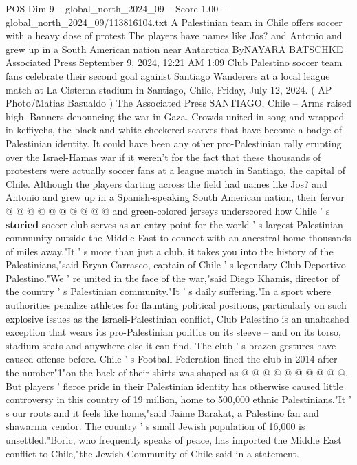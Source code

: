 \begin{textsample}{POS Dim 9 – global\_north\_2024\_09 – Score 1.00 – global\_north\_2024\_09/113816104.txt}  \label{ex:f9_pos_244}
A Palestinian team in Chile offers soccer with a heavy dose of protest The players have names like Jos? and Antonio and grew up in a South American nation near Antarctica ByNAYARA BATSCHKE Associated Press September 9, 2024, 12:21 AM 1:09 Club Palestino soccer team fans celebrate their second goal against Santiago Wanderers at a local league match at La Cisterna stadium in Santiago, Chile, Friday, July 12, 2024. ( AP Photo/Matias Basualdo ) The Associated Press SANTIAGO, Chile -- Arms raised high.
Banners denouncing the war in Gaza.
Crowds united in song and wrapped in keffiyehs, the black-and-white checkered scarves that have become a badge of Palestinian identity.
It could have been any other pro-Palestinian rally erupting over the Israel-Hamas war if it weren't for the fact that these thousands of protesters were actually soccer fans at a league match in Santiago, the capital of Chile.
Although the players darting across the field had names like Jos? and Antonio and grew up in a Spanish-speaking South American nation, their fervor @ @ @ @ @ @ @ @ @ @ and green-colored jerseys underscored how Chile ' s \textbf{storied} soccer club serves as an entry point for the world ' s largest Palestinian community outside the Middle East to connect with an ancestral home thousands of miles away."It ' s more than just a club, it takes you into the history of the Palestinians,"said Bryan Carrasco, captain of Chile ' s legendary Club Deportivo Palestino."We ' re united in the face of the war,"said Diego Khamis, director of the country ' s Palestinian community."It ' s daily suffering."In a sport where authorities penalize athletes for flaunting political positions, particularly on such explosive issues as the Israeli-Palestinian conflict, Club Palestino is an unabashed exception that wears its pro-Palestinian politics on its sleeve -- and on its torso, stadium seats and anywhere else it can find.
The club ' s brazen gestures have caused offense before.
Chile ' s Football Federation fined the club in 2014 after the number"1"on the back of their shirts was shaped as @ @ @ @ @ @ @ @ @ @.
But players ' fierce pride in their Palestinian identity has otherwise caused little controversy in this country of 19 million, home to 500,000 ethnic Palestinians."It ' s our roots and it feels like home,"said Jaime Barakat, a Palestino fan and shawarma vendor.
The country ' s small Jewish population of 16,000 is unsettled."Boric, who frequently speaks of peace, has imported the Middle East conflict to Chile,"the Jewish Community of Chile said in a statement.

\end{textsample}
